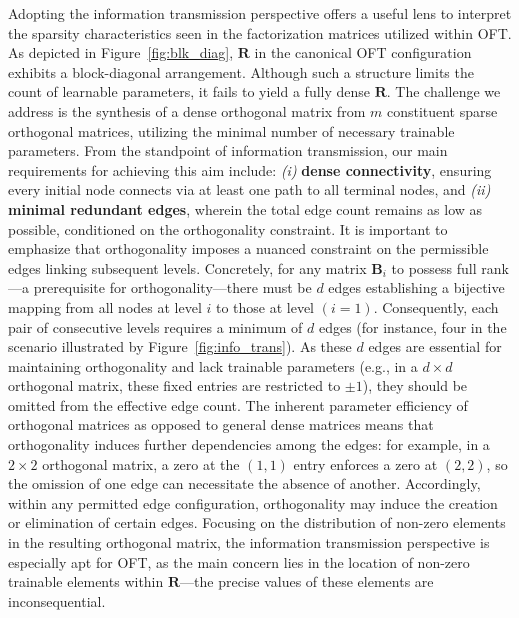 Adopting the information transmission perspective offers a useful lens to interpret the sparsity characteristics seen in the factorization matrices utilized within OFT. As depicted in Figure~\ref{fig:blk_diag}, $\bm{R}$ in the canonical OFT configuration exhibits a block-diagonal arrangement. Although such a structure limits the count of learnable parameters, it fails to yield a fully dense $\bm{R}$. The challenge we address is the synthesis of a dense orthogonal matrix from $m$ constituent sparse orthogonal matrices, utilizing the minimal number of necessary trainable parameters. From the standpoint of information transmission, our main requirements for achieving this aim include: \emph{(i)} \textbf{dense connectivity}, ensuring every initial node connects via at least one path to all terminal nodes, and \emph{(ii)} \textbf{minimal redundant edges}, wherein the total edge count remains as low as possible, conditioned on the orthogonality constraint. It is important to emphasize that orthogonality imposes a nuanced constraint on the permissible edges linking subsequent levels. Concretely, for any matrix $\bm{B}_i$ to possess full rank—a prerequisite for orthogonality—there must be $d$ edges establishing a bijective mapping from all nodes at level $i$ to those at level $(i=1)$. Consequently, each pair of consecutive levels requires a minimum of $d$ edges (for instance, four in the scenario illustrated by Figure~\ref{fig:info_trans}). As these $d$ edges are essential for maintaining orthogonality and lack trainable parameters (e.g., in a $d\times d$ orthogonal matrix, these fixed entries are restricted to $\pm 1$), they should be omitted from the effective edge count. The inherent parameter efficiency of orthogonal matrices as opposed to general dense matrices means that orthogonality induces further dependencies among the edges: for example, in a $2\times 2$ orthogonal matrix, a zero at the $(1,1)$ entry enforces a zero at $(2,2)$, so the omission of one edge can necessitate the absence of another. Accordingly, within any permitted edge configuration, orthogonality may induce the creation or elimination of certain edges. Focusing on the distribution of non-zero elements in the resulting orthogonal matrix, the information transmission perspective is especially apt for OFT, as the main concern lies in the location of non-zero trainable elements within $\bm{R}$—the precise values of these elements are inconsequential.

